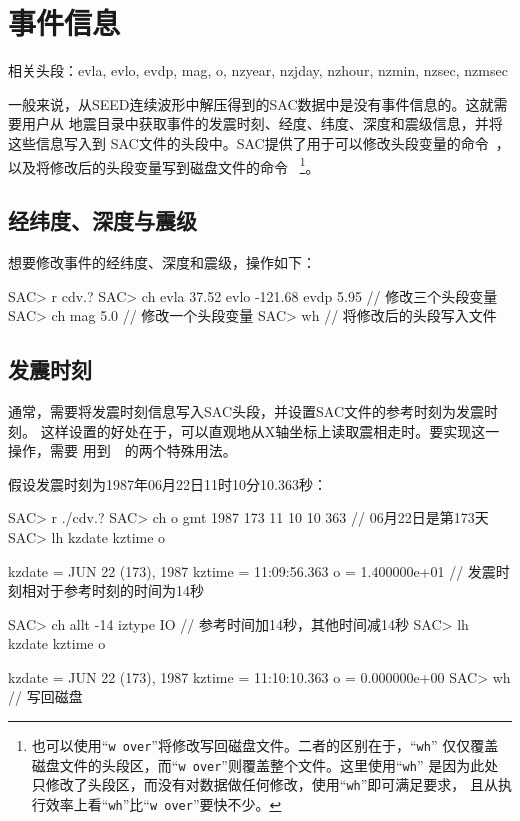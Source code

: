 \section{事件信息}
\label{sec:event-info}
相关头段：evla, evlo, evdp, mag, o, nzyear, nzjday, nzhour, nzmin, nzsec, nzmsec

一般来说，从SEED连续波形中解压得到的SAC数据中是没有事件信息的。这就需要用户从
地震目录中获取事件的发震时刻、经度、纬度、深度和震级信息，并将这些信息写入到
SAC文件的头段中。SAC提供了用于可以修改头段变量的命令~，
以及将修改后的头段变量写到磁盘文件的命令~
\footnote{
也可以使用``\verb+w over+''将修改写回磁盘文件。二者的区别在于，``\verb+wh+''
仅仅覆盖磁盘文件的头段区，而``\verb+w over+''则覆盖整个文件。这里使用``\verb+wh+''
是因为此处只修改了头段区，而没有对数据做任何修改，使用``\verb+wh+''即可满足要求，
且从执行效率上看``\verb+wh+''比``\verb+w over+''要快不少。}。

\subsection{经纬度、深度与震级}
想要修改事件的经纬度、深度和震级，操作如下：
\begin{SACCode}
SAC> r cdv.?
SAC> ch evla 37.52 evlo -121.68 evdp 5.95   // 修改三个头段变量
SAC> ch mag 5.0                             // 修改一个头段变量
SAC> wh                                     // 将修改后的头段写入文件
\end{SACCode}

\subsection{发震时刻}
通常，需要将发震时刻信息写入SAC头段，并设置SAC文件的参考时刻为发震时刻。
这样设置的好处在于，可以直观地从X轴坐标上读取震相走时。要实现这一操作，需要
用到~~的两个特殊用法。

假设发震时刻为1987年06月22日11时10分10.363秒：
\label{code:origin-time}
\begin{SACCode}
SAC> r ./cdv.?
SAC> ch o gmt 1987 173 11 10 10 363   // 06月22日是第173天
SAC> lh kzdate kztime o

     kzdate = JUN 22 (173), 1987
     kztime = 11:09:56.363
          o = 1.400000e+01       // 发震时刻相对于参考时刻的时间为14秒

SAC> ch allt -14 iztype IO       // 参考时间加14秒，其他时间减14秒
SAC> lh kzdate kztime o

     kzdate = JUN 22 (173), 1987
     kztime = 11:10:10.363
          o = 0.000000e+00
SAC> wh                          // 写回磁盘
\end{SACCode}

